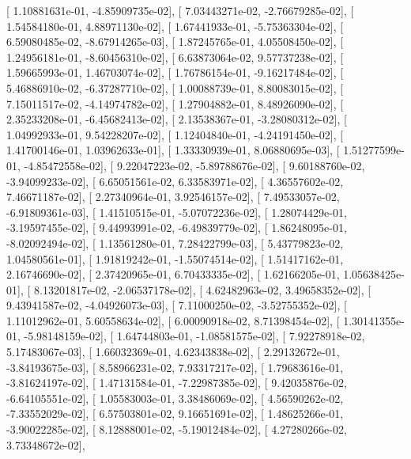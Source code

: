 \documentclass{article}
\begin{document}
       [  1.10881631e-01,  -4.85909735e-02],
       [  7.03443271e-02,  -2.76679285e-02],
       [  1.54584180e-01,   4.88971130e-02],
       [  1.67441933e-01,  -5.75363304e-02],
       [  6.59080485e-02,  -8.67914265e-03],
       [  1.87245765e-01,   4.05508450e-02],
       [  1.24956181e-01,  -8.60456310e-02],
       [  6.63873064e-02,   9.57737238e-02],
       [  1.59665993e-01,   1.46703074e-02],
       [  1.76786154e-01,  -9.16217484e-02],
       [  5.46886910e-02,  -6.37287710e-02],
       [  1.00088739e-01,   8.80083015e-02],
       [  7.15011517e-02,  -4.14974782e-02],
       [  1.27904882e-01,   8.48926090e-02],
       [  2.35233208e-01,  -6.45682413e-02],
       [  2.13538367e-01,  -3.28080312e-02],
       [  1.04992933e-01,   9.54228207e-02],
       [  1.12404840e-01,  -4.24191450e-02],
       [  1.41700146e-01,   1.03962633e-01],
       [  1.33330939e-01,   8.06880695e-03],
       [  1.51277599e-01,  -4.85472558e-02],
       [  9.22047223e-02,  -5.89788676e-02],
       [  9.60188760e-02,  -3.94099233e-02],
       [  6.65051561e-02,   6.33583971e-02],
       [  4.36557602e-02,   7.46671187e-02],
       [  2.27340964e-01,   3.92546157e-02],
       [  7.49533057e-02,  -6.91809361e-03],
       [  1.41510515e-01,  -5.07072236e-02],
       [  1.28074429e-01,  -3.19597455e-02],
       [  9.44993991e-02,  -6.49839779e-02],
       [  1.86248095e-01,  -8.02092494e-02],
       [  1.13561280e-01,   7.28422799e-03],
       [  5.43779823e-02,   1.04580561e-01],
       [  1.91819242e-01,  -1.55074514e-02],
       [  1.51417162e-01,   2.16746690e-02],
       [  2.37420965e-01,   6.70433335e-02],
       [  1.62166205e-01,   1.05638425e-01],
       [  8.13201817e-02,  -2.06537178e-02],
       [  4.62482963e-02,   3.49658352e-02],
       [  9.43941587e-02,  -4.04926073e-03],
       [  7.11000250e-02,  -3.52755352e-02],
       [  1.11012962e-01,   5.60558634e-02],
       [  6.00090918e-02,   8.71398454e-02],
       [  1.30141355e-01,  -5.98148159e-02],
       [  1.64744803e-01,  -1.08581575e-02],
       [  7.92278918e-02,   5.17483067e-03],
       [  1.66032369e-01,   4.62343838e-02],
       [  2.29132672e-01,  -3.84193675e-03],
       [  8.58966231e-02,   7.93317217e-02],
       [  1.79683616e-01,  -3.81624197e-02],
       [  1.47131584e-01,  -7.22987385e-02],
       [  9.42035876e-02,  -6.64105551e-02],
       [  1.05583003e-01,   3.38486069e-02],
       [  4.56590262e-02,  -7.33552029e-02],
       [  6.57503801e-02,   9.16651691e-02],
       [  1.48625266e-01,  -3.90022285e-02],
       [  8.12888001e-02,  -5.19012484e-02],
       [  4.27280266e-02,   3.73348672e-02],
\end{document}
